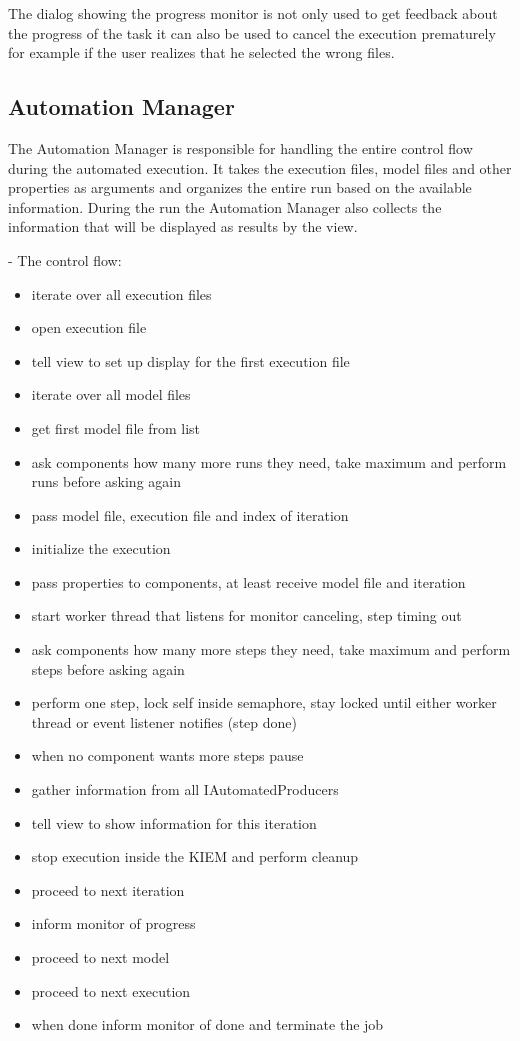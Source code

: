 The dialog showing the progress monitor is not only used to get feedback about the progress of the task
it can also be used to cancel the execution prematurely for example if the user realizes that he selected
the wrong files.

\subsection{Automation Manager}
\label{section:AutomationManager}
The Automation Manager is responsible for handling the entire control flow during the automated execution.
It takes the execution files, model files and other properties as arguments and organizes the entire
run based on the available information. During the run the Automation Manager also collects the information
that will be displayed as results by the view.


- The control flow:
\begin{itemize}
 \item iterate over all execution files
 \item open execution file
 \item tell view to set up display for the first execution file
 \item iterate over all model files
 \item get first model file from list
 \item ask components how many more runs they need, take maximum and perform runs before asking again
 \item pass model file, execution file and index of iteration
 \item initialize the execution
 \item pass properties to components, at least receive model file and iteration
 \item start worker thread that listens for monitor canceling, step timing out
 \item ask components how many more steps they need, take maximum and perform steps before asking again
 \item perform one step, lock self inside semaphore, stay locked until either worker thread or event listener notifies (step done)
 \item when no component wants more steps pause
 \item gather information from all IAutomatedProducers
 \item tell view to show information for this iteration
 \item stop execution inside the KIEM and perform cleanup
 \item proceed to next iteration
 \item inform monitor of progress
 \item proceed to next model
 \item proceed to next execution
 \item when done inform monitor of done and terminate the job
\end{itemize}


